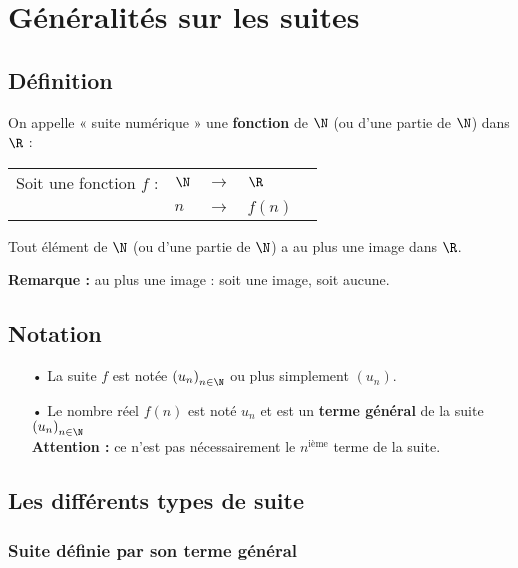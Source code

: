
\section{Généralités sur les suites}

\subsection{Définition}

On appelle « suite numérique » une \textbf{fonction} de $\N$ (ou d'une partie de $\N$) dans $\R$ : \\

\begin{tabular}{lllll}
Soit une fonction $f$ : & $\N$ & $\longrightarrow$ & $\R$ \\
& $n$ & $\longrightarrow$ & $f\left(n\right)$ \\ 
\end{tabular}

\vspace*{.3cm}

Tout élément de $\N$ (ou d'une partie de $\N$) a au plus une image dans $\R$.

\textbf{Remarque :} au plus une image : soit une image, soit aucune. 

\subsection{Notation}

\begin{itemize}
\item[•] La suite $f$ est notée $\left(u_n\right)_{n \in \N}$ ou plus simplement $\left(u_n\right)$. \\

\item[•] Le nombre réel $f\left(n\right)$ est noté $u_n$ et est un \textbf{terme général} de la suite $\left(u_n\right)_{n \in \N}$ \\

\textbf{Attention :} ce n'est pas nécessairement le $n^\mathrm{ième}$ terme de la suite. 
\end{itemize}

\subsection{Les différents types de suite}

\subsubsection{Suite définie par son terme général}

